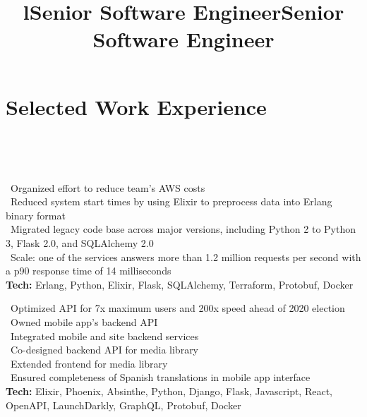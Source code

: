     \section{Selected Work Experience}

        \begin{format}
            \\
            \title{l}\\
            \body
        \end{format}
        
        \title{Senior Software Engineer}
        \begin{position}
        	\textbullet \ Organized effort to reduce team's AWS costs\\
        	\textbullet \ Reduced system start times by using Elixir to preprocess data into Erlang binary format\\
			\textbullet \ Migrated legacy code base across major versions, including Python 2 to Python 3, Flask 2.0, and SQLAlchemy 2.0\\
			\textbullet \ Scale: one of the services answers more than 1.2 million requests per second with a p90 response time of 14 milliseconds\\
			\textbf{Tech:} Erlang, Python, Elixir, Flask, SQLAlchemy, Terraform, Protobuf, Docker
        \end{position}
        
        \title{Senior Software Engineer}
        \begin{position}
			\textbullet \ Optimized API for 7x maximum users and 200x speed ahead of 2020 election\\
			\textbullet \ Owned mobile app's backend API\\
			\textbullet \ Integrated mobile and site backend services\\
			\textbullet \ Co-designed backend API for media library\\
			\textbullet \ Extended frontend for media library\\
			\textbullet \ Ensured completeness of Spanish translations in mobile app interface\\
			\textbf{Tech:} Elixir, Phoenix, Absinthe, Python, Django, Flask, Javascript, React, OpenAPI, LaunchDarkly, GraphQL, Protobuf, Docker
        \end{position}
        
